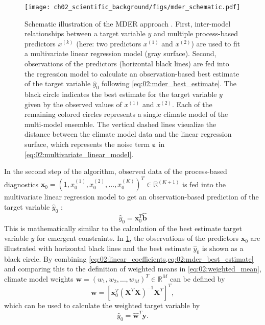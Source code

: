 \begin{figure}[t]
  \centering
  \texttt{[image: 
    ch02\_scientific\_background/figs/mder\_schematic.pdf]}
  \caption{Schematic illustration of the \acf{MDER} approach
    \autocite{Karpechko2013}. First, inter-model relationships between a target
    variable $y$ and multiple process-based predictors $x^{(k)}$ (here: two
    predictors $x^{(1)}$ and $x^{(2)}$) are used to fit a multivariate linear
    regression model (gray surface). Second, observations of the predictors
    (horizontal black lines) are fed into the regression model to calculate an
    observation-based best estimate of the target variable $\hat{y}_0$
    following \cref{eq:02:mder_best_estimate}. The black circle indicates the
    best estimate for the target variable $y$ given by the observed values of
    $x^{(1)}$ and $x^{(2)}$. Each of the remaining colored circles represents
    a single climate model of the multi-model ensemble. The vertical dashed
    lines visualize the distance between the climate model data and the linear
    regression surface, which represents the noise term $\bm{\varepsilon}$ in
    \cref{eq:02:multivariate_linear_model}.}
  \label{fig:02:mder}
\end{figure}

In the second step of the algorithm, observed data of the process-based
diagnostics $\bm{x}_0 = \left( 1, x_0^{(1)}, x_0^{(2)}, \ldots, x_0^{(K)}
\right)^T \in \mathbb{R}^{(K + 1)}$ is fed into the multivariate linear
regression model to get an observation-based prediction of the target variable
$\hat{y}_0$
\autocite{Karpechko2013}:
\begin{equation}
  \hat{y}_0 = \bm{x}_0^T \hat{\bm{b}}
  \label{eq:02:mder_best_estimate}
\end{equation}
This is mathematically similar to the calculation of the best estimate target
variable $y$ for emergent constraints. In \cref{fig:02:mder}, the observations
of the predictors $\bm{x}_0$ are illustrated with horizontal black lines and
the best estimate $\hat{y}_0$ is shown as a black circle. By combining
\cref{eq:02:linear_coefficients,eq:02:mder_best_estimate} and comparing this to
the definition of weighted means in \cref{eq:02:weighted_mean}, climate model
weights $\bm{w} = \left( w_1, w_2, \ldots, w_M \right)^T \in \mathbb{R}^M$ can
be defined by
\begin{equation}
  \bm{w} = \left[ \bm{x}_0^T \left( \bm{X}^T \bm{X} \right)^{-1} \bm{X}^T
  \right]^T,
  \label{eq:02:mder_weights}
\end{equation}
which can be used to calculate the weighted target variable by
\begin{equation}
  \hat{y}_0 = \hat{\bm{w}}^T \bm{y}.
  \label{eq:02:weighted_mean_vector}
\end{equation}

